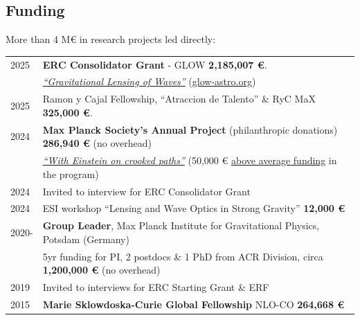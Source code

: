 \documentclass[11pt,a4paper]{article}
\begin{document}
\subsection*{Funding}
More than 4 M\euro{} in research projects led directly:  %
\vspace{-8pt}
\begin{longtable}{l p{14.5 cm}}
2025 & \textbf{ERC Consolidator Grant} - GLOW  \textbf{2,185,007 \euro}. %
\\ & \href{https://www.aei.mpg.de/1359867/erc-consolidator-grant-for-miguel-zumalac-rregui}{\it ``Gravitational Lensing of Waves''} \; (\href{https://glow-astro.org/}{glow-astro.org})
\\[3pt] 
2025 & Ramon y Cajal Fellowship, ``Atraccion de Talento'' \&  RyC MaX \textbf{325,000 \euro}.
\\[3pt]
2024 & \textbf{Max Planck Society's Annual Project} (philanthropic donations)
  \textbf{286,940 \euro} (no overhead) %
\\[1pt]
& \href{https://www.mpg.de/annualproject2024} {\textit{``With Einstein on crooked paths''}} (50,000 \euro{} \href{https://www.aei.mpg.de/1227766/with-einstein-on-crooked-paths}{above average funding} in the program)
\\[3pt]
2024 & Invited to interview for ERC Consolidator Grant %
\\[3pt]
2024 & ESI workshop ``Lensing and Wave Optics in Strong Gravity'' \textbf{12,000 \euro}\\[3pt]
2020- & \textbf{Group Leader}, Max Planck Institute for Gravitational Physics, Potsdam (Germany) \\ & 5yr funding for PI, 2 postdocs \& 1 PhD from ACR Division, circa \textbf{1,200,000 \euro} (no overhead)\\[3pt]
2019 &  Invited to interviews for ERC Starting Grant \& ERF %
\\[3pt]
2015 & \textbf{Marie Sklowdoska-Curie Global Fellowship} NLO-CO \textbf{264,668 \euro} %

\end{longtable}
\end{document}
